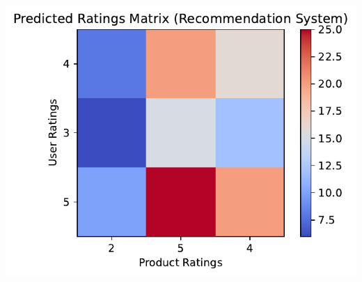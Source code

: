 \documentclass[
  letterpaper,
  DIV=11,
  numbers=noendperiod]{scrreprt}
\theoremstyle{plain}
\theoremstyle{definition}
\theoremstyle{remark}
\begin{document}
\includegraphics{module_2_files/figure-pdf/cell-29-output-3.pdf}
\end{document}
